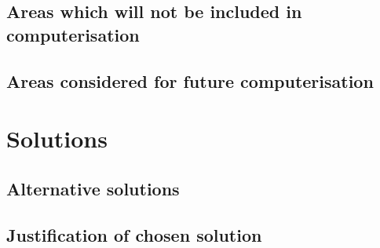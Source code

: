 \subsection{Areas which will not be included in computerisation}

\subsection{Areas considered for future computerisation}

\section{Solutions}

\subsection{Alternative solutions}

\subsection{Justification of chosen solution}